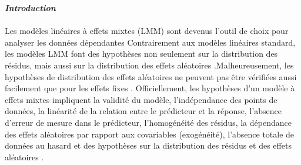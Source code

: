 \documentclass{article}
\begin{document}
\textbf{\textit{Introduction}} \\  \\


Les modèles linéaires à effets mixtes (LMM) sont devenus l'outil de choix pour analyser les données dépendantes Contrairement aux modèles linéaires standard, les modèles LMM font des hypothèses non seulement sur la distribution des résidus, mais aussi sur la distribution des effets aléatoires .Malheureusement, les hypothèses de distribution des effets aléatoires ne peuvent pas être vérifiées aussi facilement que pour les effets fixes .
Officiellement, les hypothèses d'un modèle à effets mixtes impliquent la validité du modèle, l'indépendance des points de données, la linéarité de la relation entre le prédicteur et la réponse, l'absence d'erreur de mesure dans le prédicteur, l'homogénéité des résidus, la dépendance des effets aléatoires par rapport aux covariables (exogénéité), l'absence totale de données au hasard et des hypothèses sur la distribution des résidus et des effets aléatoires . \\
\end{document}
